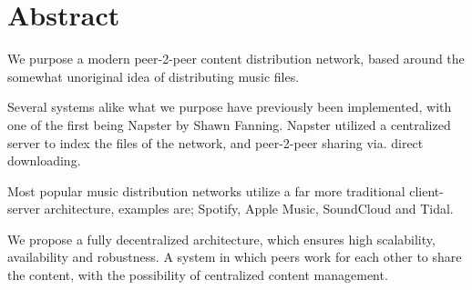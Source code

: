 \begingroup
\let\clearpage\relax
\let\cleardoublepage\relax
\let\cleardoublepage\relax

\chapter*{Abstract}

We purpose a modern peer-2-peer content distribution network, based around the
somewhat unoriginal idea of distributing music files.

Several systems alike what we purpose have previously been implemented, with 
one of the first being Napster by Shawn Fanning. Napster utilized a centralized
server to index the files of the network, and peer-2-peer sharing via. direct
downloading.

Most popular music distribution networks utilize a far more traditional client-
server architecture, examples are; Spotify, Apple Music, SoundCloud and Tidal.

We propose a fully decentralized architecture, which ensures high scalability,
availability and robustness. A system in which peers work for each other to 
share the content, with the possibility of centralized content management.

\vfill



\endgroup			

\vfill
